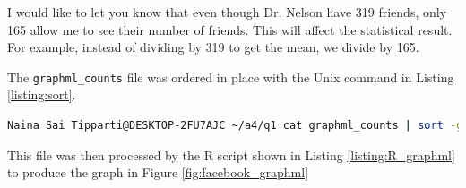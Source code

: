 \vspace*{5pt}

I would like to let you know that even though Dr. Nelson have 319 friends, only 165 allow me to see their number of friends. This will affect the statistical result. For example, instead of dividing by 319 to get the mean, we divide by 165.

The {\tt graphml\_counts} file was ordered in place with the Unix command in Listing \ref{listing:sort}. 
\\
\begin{lstlisting}[language=Bash,caption={Sort command},label=listing:sort]
Naina Sai Tipparti@DESKTOP-2FU7AJC ~/a4/q1 cat graphml_counts | sort -g -o graphml_counts
\end{lstlisting}

This file was then processed by the R script shown in Listing \ref{listing:R_graphml} to produce the graph in Figure \ref{fig:facebook_graphml}

